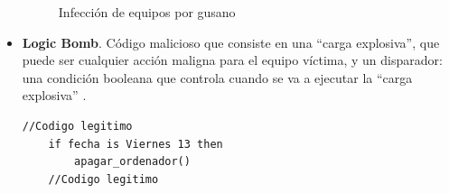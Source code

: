 \begin{itemize}
    \begin{figure}[htb]
    \begin{center}
    {}
    \end{center}
    \caption{Infección de equipos por gusano}
    \label{fig:im4}
    \end{figure}
    
    \item \textbf{Logic Bomb}. Código malicioso que consiste en una ``carga explosiva'', que puede ser cualquier acción maligna para el equipo víctima, y un disparador: una condición booleana que controla cuando se va a ejecutar la ``carga explosiva'' \cite{virusbomb}.
    
    \begin{algorithm}[htb!]
\renewcommand{\lstlistingname}{Algoritmo}
\begin{lstlisting}[language=config, caption={Ejemplo de bomba lógica sencilla}, captionpos=b, firstnumber=1, linewidth=14.4cm]
    //Codigo legitimo
    if fecha is Viernes 13 then
        apagar_ordenador()
    //Codigo legitimo
    \end{lstlisting}
\label{Alg:imx1}
\end{algorithm}

        
\end{itemize}
